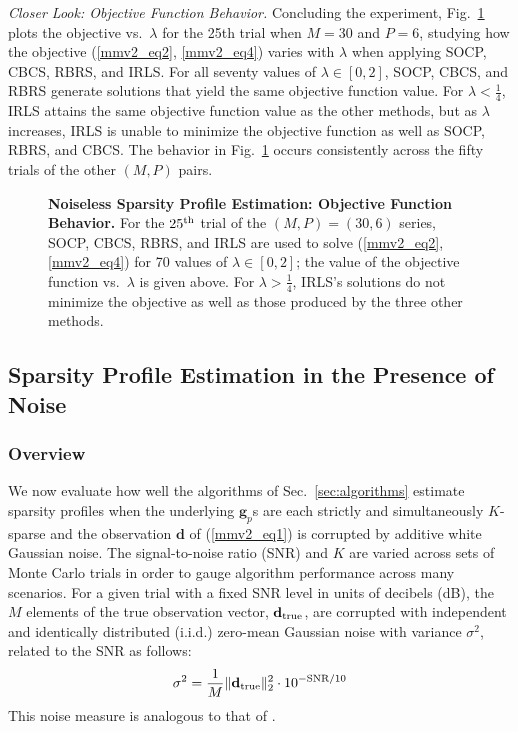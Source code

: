 \documentclass[final]{siamltex}
\newcommand{\la}[1]{\mbox{$\mathbf{#1}$}}  \newcommand{\sst}[1]{\mbox{\scriptsize{#1}}}
\begin{document}
   {\em{Closer Look: Objective Function Behavior}.}  Concluding the
   experiment, Fig.~\ref{fig:e1_objfun} plots the objective
   vs.~$\lambda$ for the 25th trial when $M=30$ and $P=6$,
   studying how the objective (\ref{mmv2_eq2}, \ref{mmv2_eq4}) varies
   with $\lambda$ when applying SOCP, CBCS, RBRS, and IRLS\@.  For all
   seventy values of $\lambda \in [0, 2]$, SOCP, CBCS, and RBRS
   generate solutions that yield the same objective function value.
   For $\lambda < \frac{1}{4}$, IRLS attains the same objective
   function value as the other methods, but as $\lambda$ increases,
   IRLS is unable to minimize the objective function as well as SOCP,
   RBRS, and CBCS\@.  The behavior in Fig.~\ref{fig:e1_objfun} occurs
   consistently across the fifty trials of the other $(M, P)$ pairs.

\begin{figure}\centering

      \caption{{\bf{Noiseless Sparsity Profile Estimation: Objective
      Function Behavior}.} For the $25^{\sst{th}}$ trial of the
      $(M,P)=(30,6)$ series, SOCP, CBCS, RBRS, and IRLS are used to
      solve (\ref{mmv2_eq2}, \ref{mmv2_eq4}) for 70 values of $\lambda
      \in [0, 2]$; the value of the objective function vs.~$\lambda$
      is given above.  For $\lambda > \frac{1}{4}$, IRLS's solutions
      do not minimize the objective as well as those produced by the
      three other methods.}

      \label{fig:e1_objfun}
   \end{figure}


\subsection{Sparsity Profile Estimation in the Presence of Noise}
\label{subsec:e2}

   \subsubsection{Overview} We now evaluate how well the algorithms of
   Sec.~\ref{sec:algorithms} estimate sparsity profiles when the
   underlying $\la{g}_p$s are each strictly and simultaneously
   $K$-sparse and the observation $\la{d}$ of (\ref{mmv2_eq1}) is
   corrupted by additive white Gaussian noise.  The
   signal-to-noise ratio (SNR) and $K$ are varied across sets of Monte
   Carlo trials in order to gauge algorithm performance across many
   scenarios.  For a given trial with a fixed SNR level in units of
   decibels (dB), the $M$ elements of the true observation vector,
   $\la{d}_{\sst{true}}$, are corrupted with independent and
   identically distributed (i.i.d.)  zero-mean Gaussian noise with
   variance $\sigma^2$, related to the SNR as follows:
   \begin{equation}\label{snr} 
      \sigma^2 = \frac{1}{M} \Vert \la{d}_{\sst{true}} \Vert_2^2 
                             \cdot 10^{-\sst{SNR}/10}
   \end{equation}
   This noise measure is analogous to that of \cite{Cot2005}.
    
\end{document}
